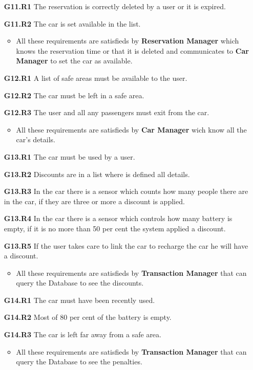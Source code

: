 \begin{itemize}
\item[\textbf{G11.R1}] The reservation is correctly deleted by a user or it is expired. 
\item[\textbf{G11.R2}] The car is set available in the list.
\begin{itemize}
\item All these requirements are satisfieds by \textbf{Reservation Manager} which knows the reservation time or that it is deleted and communicates to \textbf{Car Manager} to set the car as available.
\end{itemize}


\item[\textbf{G12.R1}] A list of safe areas must be available to the user.
\item[\textbf{G12.R2}] The car must be left in a safe area.
\item[\textbf{G12.R3}] The user and all any passengers must exit from the car.
\begin{itemize}
\item All these requirements are satisfieds by \textbf{Car Manager} wich know all the car's details.
\end{itemize}


\item[\textbf{G13.R1}] The car must be used by a user.
\item[\textbf{G13.R2}] Discounts are in a list where is defined all details.
\item[\textbf{G13.R3}] In the car there is a sensor which counts how many people there are in the car, if they are three or more a discount is applied.
\item[\textbf{G13.R4}] In the car there is a sensor which controls how many battery is empty, if it is no more than 50 per cent the system applied a discount.
\item[\textbf{G13.R5}] If the user takes care to link the car to recharge the car he will have a discount.
\begin{itemize}
\item All these requirements are satisfieds by \textbf{Transaction Manager} that can query the Database to see the discounts.
\end{itemize}

\item[\textbf{G14.R1}] The car must have been recently used.
\item[\textbf{G14.R2}] Most of 80 per cent of the battery is empty.
\item[\textbf{G14.R3}] The car is left far away from a safe area.
\begin{itemize}
\item All these requirements are satisfieds by \textbf{Transaction Manager} that can query the Database to see the penalties.
\end{itemize}


\end{itemize}
